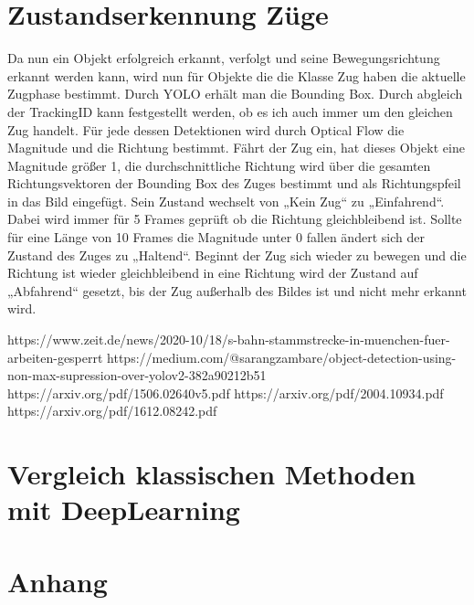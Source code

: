 \documentclass[conference]{IEEEtran}
\begin{document}
	\section{Zustandserkennung Züge}
	Da nun ein Objekt erfolgreich erkannt, verfolgt und seine Bewegungsrichtung erkannt werden kann, wird nun für Objekte die die Klasse Zug haben die aktuelle Zugphase bestimmt. 
	Durch YOLO erhält man die Bounding Box. Durch abgleich der TrackingID kann festgestellt werden, ob es ich auch immer um den gleichen Zug handelt. Für jede dessen Detektionen wird durch Optical Flow die Magnitude und die Richtung bestimmt. Fährt der Zug ein, hat dieses Objekt eine Magnitude größer 1, die durchschnittliche Richtung wird über die gesamten Richtungsvektoren der Bounding Box des Zuges bestimmt und als Richtungspfeil in das Bild eingefügt. Sein Zustand wechselt von „Kein Zug“ zu „Einfahrend“. Dabei wird immer für 5 Frames geprüft ob die Richtung gleichbleibend ist. Sollte für eine Länge von 10 Frames die Magnitude unter 0 fallen ändert sich der Zustand des Zuges zu „Haltend“. Beginnt der Zug sich wieder zu bewegen und die Richtung ist wieder gleichbleibend in eine Richtung wird der Zustand auf „Abfahrend“ gesetzt, bis der Zug außerhalb des Bildes ist und nicht mehr erkannt wird.
	
	\begin{thebibliography}{00}
		https://www.zeit.de/news/2020-10/18/s-bahn-stammstrecke-in-muenchen-fuer-arbeiten-gesperrt
		https://medium.com/@sarangzambare/object-detection-using-non-max-supression-over-yolov2-382a90212b51
		https://arxiv.org/pdf/1506.02640v5.pdf
		https://arxiv.org/pdf/2004.10934.pdf
		https://arxiv.org/pdf/1612.08242.pdf
	\end{thebibliography}
	
	\section{Vergleich klassischen Methoden mit DeepLearning}
	
	\section{Anhang}
	
\end{document}
